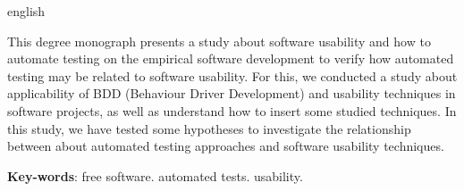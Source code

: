 
\begin{resumo}[Abstract]
  \begin{otherlanguage*}{english}  
  
This degree monograph presents a study about software usability and how to automate testing on the empirical software development to verify how automated testing may be related to software usability. For this, we conducted a study about applicability of BDD (Behaviour Driver Development) and usability techniques in software projects, as well as understand how to insert some studied techniques. In this study, we have tested some hypotheses to investigate the relationship between about automated testing approaches and software usability techniques.



   \vspace{\onelineskip}
 
  \noindent 
  \textbf{Key-words}: free software. automated tests. usability.
  \end{otherlanguage*}
\end{resumo}


